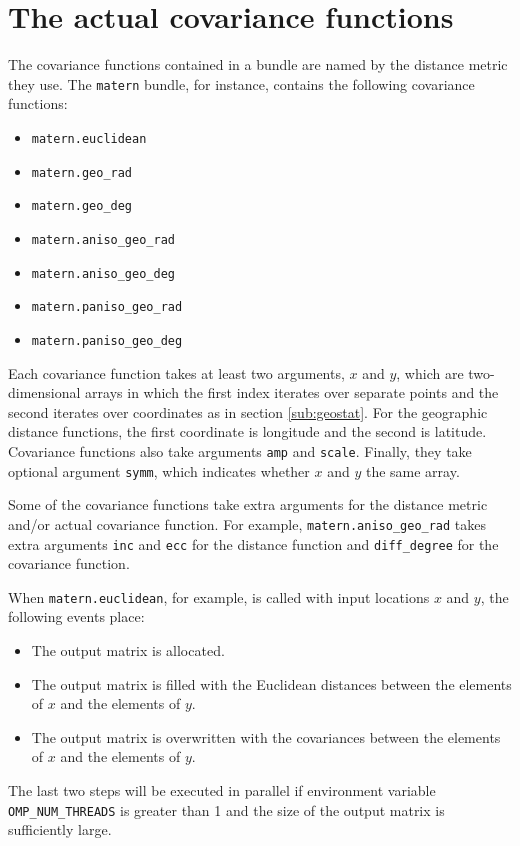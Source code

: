\section{The actual covariance functions}\label{sub:distances}
The covariance functions contained in a bundle are named by the distance metric they use. The \texttt{matern} bundle, for instance, contains the following covariance functions:
\begin{itemize}
	\item \texttt{matern.euclidean}
	\item \texttt{matern.geo_rad}
	\item \texttt{matern.geo_deg}
	\item \texttt{matern.aniso_geo_rad}
	\item \texttt{matern.aniso_geo_deg}
	\item \texttt{matern.paniso_geo_rad}
	\item \texttt{matern.paniso_geo_deg}
\end{itemize}

Each covariance function takes at least two arguments, $x$ and $y$, which are two-dimensional arrays in which the first index iterates over separate points and the second iterates over coordinates as in section \ref{sub:geostat}. For the geographic distance functions, the first coordinate is longitude and the second is latitude. Covariance functions also take arguments \texttt{amp} and \texttt{scale}. Finally, they take optional argument \texttt{symm}, which indicates whether $x$ and $y$ the same array.

Some of the covariance functions take extra arguments for the distance metric and/or actual covariance function. For example, \texttt{matern.aniso_geo_rad} takes extra arguments \texttt{inc} and \texttt{ecc} for the distance function and \texttt{diff_degree} for the covariance function.

When \texttt{matern.euclidean}, for example, is called with input locations $x$ and $y$, the following events place:
\begin{itemize}
	\item The output matrix is allocated.
	\item The output matrix is filled with the Euclidean distances between the elements of $x$ and the elements of $y$.
	\item The output matrix is overwritten with the covariances between the elements of $x$ and the elements of $y$.
\end{itemize}
The last two steps will be executed in parallel if environment variable \texttt{OMP_NUM_THREADS} is greater than 1 and the size of the output matrix is sufficiently large.

